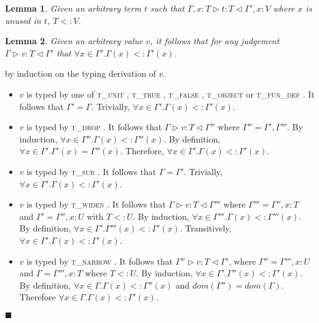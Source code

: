 \documentclass[preprint]{sigplanconf}
\newtheorem{lem}{Lemma}
\newcommand{\tunit}{\textsc{t\_unit} }
\newcommand{\ttrue}{\textsc{t\_true} }
\newcommand{\tfalse}{\textsc{t\_false} }
\newcommand{\tobj}{\textsc{t\_object} }
\newcommand{\tfundef}{\textsc{t\_fun\_def} }
\newcommand{\tdrop}{\textsc{t\_drop} }
\newcommand{\tsub}{\textsc{t\_sub} }
\newcommand{\tnarrow}{\textsc{t\_narrow} }
\newcommand{\twiden}{\textsc{t\_widen} }
\newcommand{\typerule}[4]{#1 \triangleright #2 : #3 \triangleleft #4}
\newcommand{\qed}{$\blacksquare$}
\newenvironment{proof}{\vspace{1ex}\noindent{\bf Proof}\hspace{0.5em}}
  {\hfill\qed\vspace{1ex}}
\begin{document}

\begin{lem}
\label{lem:unused}
Given an arbitrary term $t$ such that 
$\typerule{\Gamma, x : T}{t}{T}{\Gamma', x : V}$ where $x$ is unused in
$t$, $T <: V$.
\end{lem}



\begin{lem}
\label{lem:valuectx}
Given an arbitrary value $v$, it follows that for any judgement
$\typerule{\Gamma}{v}{T}{\Gamma'}$ that 
$\forall x \in \Gamma' . \Gamma(x) <: \Gamma'(x)$.
\end{lem}
\begin{proof}
by induction on the typing derivation of $v$.

\begin{itemize}
\item $v$ is typed by one of \tunit, \ttrue, \tfalse,
\tobj or \tfundef. It follows that $\Gamma' = \Gamma$. Trivially,
$\forall x \in \Gamma' . \Gamma(x) <: \Gamma'(x)$.

\item $v$ is typed by \tdrop. It follows that $\typerule{\Gamma}{v}{T}{\Gamma''}$
where $\Gamma'' = \Gamma', \Gamma'''$. By induction,
$\forall x \in \Gamma'' . \Gamma(x) <: \Gamma''(x)$.
By definition, $\forall x \in \Gamma' . \Gamma'(x) = \Gamma''(x)$.
Therefore, $\forall x \in \Gamma' . \Gamma(x) <: \Gamma'(x)$.

\item $v$ is typed by \tsub. It follows that $\Gamma = \Gamma'$. Trivially,
$\forall x \in \Gamma' . \Gamma(x) <: \Gamma'(x)$.

\item $v$ is typed by \twiden. It follows that $\typerule{\Gamma}{v}{T}{\Gamma'''}$
where $\Gamma''' = \Gamma'', x : T$ and $\Gamma' = \Gamma'', x : U$ with
$T <: U$. By induction, $\forall x \in \Gamma''' . \Gamma(x) <: \Gamma'''(x)$.
By definition, $\forall x \in \Gamma' . \Gamma'''(x) <: \Gamma'(x)$. Transitively,
$\forall x \in \Gamma' . \Gamma(x) <: \Gamma'(x)$.

\item $v$ is typed by \tnarrow. It follows that $\typerule{\Gamma''}{v}{T}{\Gamma'}$,
where $\Gamma'' = \Gamma''', x : U$ and $\Gamma = \Gamma''', x : T$ where
$T <: U$. By induction, $\forall x \in \Gamma' . \Gamma''(x) <: \Gamma'(x)$.
By definition, $\forall x \in \Gamma . \Gamma(x) <: \Gamma''(x)$ and
$dom(\Gamma'') = dom(\Gamma)$. Therefore
$\forall x \in \Gamma . \Gamma(x) <: \Gamma'(x)$.

\end{itemize}
\end{proof}
\end{document}

